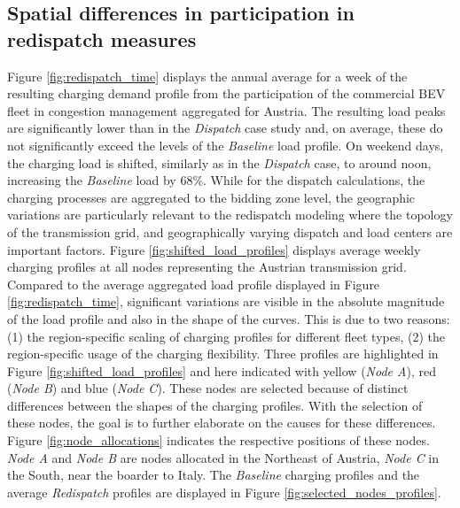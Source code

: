 \documentclass[final,10pt]{elsarticle}
\begin{document}
        \subsection{Spatial differences in participation in redispatch measures}
        Figure \ref{fig:redispatch_time} displays the annual average for a week of the resulting charging demand profile from the participation of the commercial \ac{BEV} fleet in congestion management aggregated for Austria. The resulting load peaks are significantly lower than in the \textit{Dispatch} case study and, on average, these do not significantly exceed the levels of the \textit{Baseline} load profile. On weekend days, the charging load is shifted, similarly as in the \textit{Dispatch} case, to around noon, increasing the \textit{Baseline} load by 68\%. 
        While for the dispatch calculations, the charging processes are aggregated to the bidding zone level, the geographic variations are particularly relevant to the redispatch modeling where the topology of the transmission grid, and geographically varying dispatch and load centers are important factors. Figure \ref{fig:shifted_load_profiles} displays average weekly charging profiles at all nodes representing the Austrian transmission grid. Compared to the average aggregated load profile displayed in Figure \ref{fig:redispatch_time}, significant variations are visible in the absolute magnitude of the load profile and also in the shape of the curves. This is due to two reasons: (1) the region-specific scaling of charging profiles for different fleet types, (2) the region-specific usage of the charging flexibility. Three profiles are highlighted in Figure \ref{fig:shifted_load_profiles} and here indicated with yellow (\textit{Node A}), red (\textit{Node B}) and blue (\textit{Node C}). These nodes are selected because of distinct differences between the shapes of the charging profiles. With the selection of these nodes, the goal is to further elaborate on the causes for these differences. Figure \ref{fig:node_allocations} indicates the respective positions of these nodes. \textit{Node A} and \textit{Node B} are nodes allocated in the Northeast of Austria, \textit{Node C} in the South, near the boarder to Italy. The \textit{Baseline} charging profiles and the average \textit{Redispatch} profiles are displayed in Figure \ref{fig:selected_nodes_profiles}.
        
\end{document}
